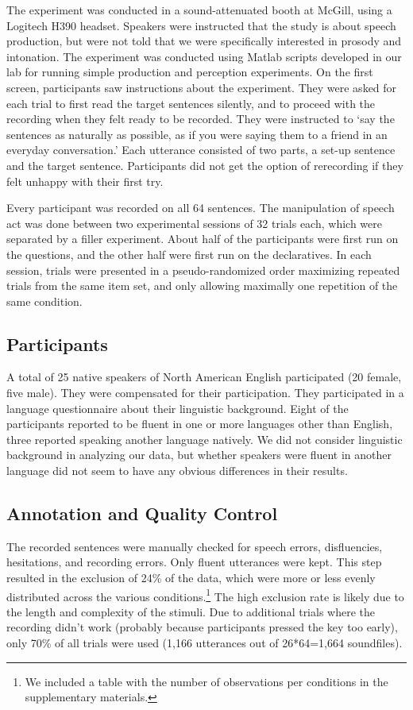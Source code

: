 \documentclass[preprint,review,12pt,authoryear,times]{elsarticle}
\begin{document}
The experiment was conducted in a sound-attenuated booth at McGill, using a Logitech H390 headset. Speakers were instructed that the study is about speech production, but were not told that we were specifically interested in prosody and intonation. The experiment was conducted using Matlab scripts developed in our lab for running simple production and perception experiments. On the first screen, participants saw instructions about the experiment. They were asked for each trial to  first read the target sentences silently, and to proceed with the recording when they felt ready to be recorded.  They were instructed to `say the sentences as naturally as possible, as if you were saying them to a friend in an everyday conversation.' Each utterance consisted of two parts, a set-up sentence and the target sentence. Participants did not get the option of rerecording if they felt unhappy with their first try.

Every participant was recorded on all 64 sentences. The manipulation of speech act was done between two experimental sessions of 32 trials each, which were separated by a filler experiment. About half of the participants were first run on the questions, and the other half were first run on the declaratives.  In each session, trials were presented in a pseudo-randomized order maximizing repeated trials from the same item set, and only allowing maximally one repetition of the same condition. 


\subsection{Participants}

A total of 25 native speakers of North American English participated (20 female, five male). They were compensated for their participation. They participated in a language questionnaire about their linguistic background. Eight of the participants reported to be fluent in one or more languages other than English, three reported speaking another language natively. We did not consider linguistic background in analyzing our data, but whether speakers were fluent in another language did not seem to have any obvious differences in their results. 


\subsection{Annotation and Quality Control}

The recorded sentences were manually checked for speech errors, disfluencies, hesitations, and recording errors. Only fluent utterances were kept. This step resulted in the exclusion of  24\% of the data, which were more or less evenly distributed across the various conditions.\footnote{We included a table with the number of observations per conditions in the supplementary materials.}  The high exclusion rate is likely due to the length and complexity of the stimuli. Due to additional trials where the recording didn't work (probably because participants pressed the key too early), only 70\% of all trials were used (1,166 utterances out of 26*64=1,664 soundfiles). 
\end{document}
